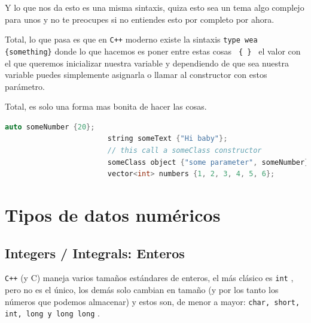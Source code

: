 \documentclass[12pt, fleqn]{report}                             %
\theoremstyle{break}                                            %
\newcommand{\textCode}[1]  { \texttt{#1} }                      %
\newcommand \Cpp  {\textCode{C++} }                               %
\begin{document}
                    Y lo que nos da esto es una misma sintaxis, quiza esto sea un tema algo complejo
                    para unos y no te preocupes si no entiendes esto por completo por ahora.

                    Total, lo que pasa es que en \Cpp moderno existe la sintaxis 
                    \textCode{type wea \{something\}} donde lo que hacemos es poner entre estas cosas
                    \textCode{ \{ \} } el valor con el que queremos inicializar nuestra variable y dependiendo
                    de que sea nuestra variable puedes simplemente asignarla o llamar al constructor con estos
                    parámetro.

                    Total, es solo una forma mas bonita de hacer las cosas.

                    \begin{lstlisting}[language=C++, gobble=24]
                        auto someNumber {20};   
                        string someText {"Hi baby"};
                        // this call a someClass constructor
                        someClass object {"some parameter", someNumber};
                        vector<int> numbers {1, 2, 3, 4, 5, 6};
                    \end{lstlisting}


        \clearpage
        \section{Tipos de datos numéricos}

            \subsection{Integers / Integrals: Enteros}

                \Cpp (y C) maneja varios tamaños estándares de enteros, el más clásico
                es \textCode{int}, pero no es el único, los demás solo cambian en tamaño
                (y por los tanto los números que podemos almacenar)
                y estos son, de menor a mayor: \textCode{char, short, int, long y long long}.
\end{document}
